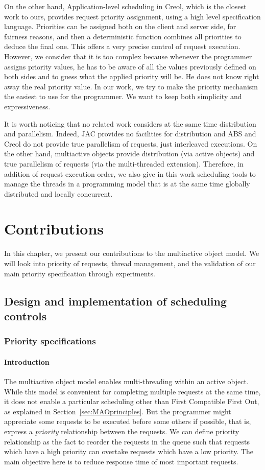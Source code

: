 \documentclass[11pt]{report}
\begin{document}
On the other hand, Application-level scheduling in Creol, which is the closest work to ours, provides request priority assignment, using a high level specification language. Priorities can be assigned both on the client and server side, for fairness reasons, and then a deterministic function combines all priorities to deduce the final one. This offers a very precise control of request execution. However, we consider that it is too complex because whenever the programmer assigns priority values, he has to be aware of all the values previously defined on both sides and to guess what the applied priority will be. He does not know right away the real priority value. In our work, we try to make the priority mechanism the easiest to use for the programmer. We want to keep both simplicity and expressiveness.

It is worth noticing that no related work considers at the same time distribution and parallelism. Indeed, JAC provides no facilities for distribution and ABS and Creol do not provide true parallelism of requests, just interleaved executions. On the other hand, multiactive objects provide distribution (via active objects) and true parallelism of requests (via the multi-threaded extension). Therefore, in addition of request execution order, we also give in this work scheduling tools to manage the threads in a programming model that is at the same time globally distributed and locally concurrent.

\chapter{Contributions}\label{sec:contributions}
In this chapter, we present our contributions to the multiactive object model. We will look into priority of requests, thread management, and the validation of our main priority specification through experiments.

\section{Design and implementation of scheduling controls}
\subsection{Priority specifications}
\subsubsection{Introduction}
The multiactive object model enables multi-threading within an active object. While this model is convenient for completing multiple requests at the same time, it does not enable a particular scheduling other than First Compatible First Out, as explained in Section~\ref{sec:MAOprinciples}. But the programmer might appreciate some requests to be executed before some others if possible, that is, express a \emph{priority} relationship between the requests. 
We can define priority relationship as the fact to reorder the requests in the queue such that requests which have a high priority can overtake requests which have a low priority. 
The main objective here is to reduce response time of most important requests. 
\end{document}

